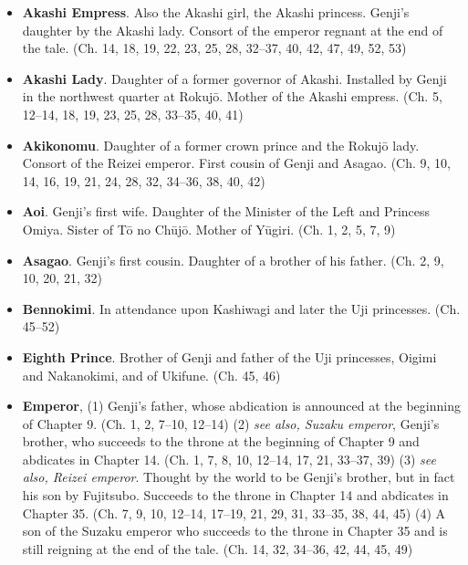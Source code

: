 \documentclass{article}
\begin{document}
\setlength{\columnsep}{5em}
\begin{multicols}{2}

	\begin{itemize}[
			label=,
			leftmargin=0em,
			rightmargin=-1.5em,
			itemindent=-2em,
			nosep,
		]
		\setlength{\itemsep}{0.25em}

		\item \textbf{Akashi Empress}. Also the Akashi girl, the Akashi princess. Genji's daughter by the Akashi lady. Consort of the emperor regnant at the end of the tale. (Ch. 14, 18, 19, 22, 23, 25, 28, 32--37, 40, 42, 47, 49, 52, 53)

		\item \textbf{Akashi Lady}. Daughter of a former governor of Akashi. Installed by Genji in the northwest quarter at Rokujō. Mother of the Akashi empress. (Ch. 5, 12--14, 18, 19, 23, 25, 28, 33--35, 40, 41)

		\item \textbf{Akikonomu}. Daughter of a former crown prince and the Rokujō lady. Consort of the Reizei emperor. First cousin of Genji and Asagao. (Ch. 9, 10, 14, 16, 19, 21, 24, 28, 32, 34--36, 38, 40, 42)

		\item \textbf{Aoi}. Genji's first wife. Daughter of the Minister of the Left and Princess Omiya. Sister of Tō no Chūjō. Mother of Yūgiri. (Ch. 1, 2, 5, 7, 9)

		\item \textbf{Asagao}. Genji's first cousin. Daughter of a brother of his father. (Ch. 2, 9, 10, 20, 21, 32)

		\item \textbf{Bennokimi}. In attendance upon Kashiwagi and later the Uji princesses. (Ch. 45--52)

		\item \textbf{Eighth Prince}. Brother of Genji and father of the Uji princesses, Oigimi and Nakanokimi, and of Ukifune. (Ch. 45, 46)

		\item \textbf{Emperor}, (1) Genji's father, whose abdication is announced at the beginning of Chapter 9. (Ch. 1, 2, 7--10, 12--14)
		      (2) \textit{see also, Suzaku emperor}, Genji's brother, who succeeds to the throne at the beginning of Chapter 9 and abdicates in Chapter 14. (Ch. 1, 7, 8, 10, 12--14, 17, 21, 33--37, 39)
		      (3) \textit{see also, Reizei emperor}. Thought by the world to be Genji's brother, but in fact his son by Fujitsubo. Succeeds to the throne in Chapter 14 and abdicates in Chapter 35. (Ch. 7, 9, 10, 12--14, 17--19, 21, 29, 31, 33--35, 38, 44, 45)
		      (4) A son of the Suzaku emperor who succeeds to the throne in Chapter 35 and is still reigning at the end of the tale. (Ch. 14, 32, 34--36, 42, 44, 45, 49)


\end{itemize}
\end{multicols}
\end{document}
